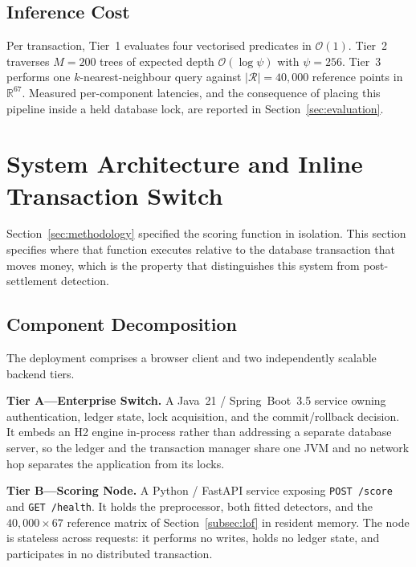 \documentclass[conference]{IEEEtran}
\begin{document}
\subsection{Inference Cost}
\label{subsec:cost}

Per transaction, Tier~1 evaluates four vectorised predicates in
$\mathcal{O}(1)$. Tier~2 traverses $M=200$ trees of expected depth
$\mathcal{O}(\log \psi)$ with $\psi = 256$. Tier~3 performs one
$k$-nearest-neighbour query against $|\mathcal{R}| = 40{,}000$
reference points in $\mathbb{R}^{67}$. Measured per-component
latencies, and the consequence of placing this pipeline inside a held
database lock, are reported in Section~\ref{sec:evaluation}.

\section{System Architecture and Inline Transaction Switch}
\label{sec:architecture}

Section~\ref{sec:methodology} specified the scoring function in
isolation. This section specifies where that function executes relative
to the database transaction that moves money, which is the property
that distinguishes this system from post-settlement detection.

\subsection{Component Decomposition}
\label{subsec:components}

The deployment comprises a browser client and two independently
scalable backend tiers.

\textbf{Tier A---Enterprise Switch.} A Java~21 / Spring~Boot~3.5
service owning authentication, ledger state, lock acquisition, and the
commit/rollback decision. It embeds an H2 engine in-process rather than
addressing a separate database server, so the ledger and the
transaction manager share one JVM and no network hop separates the
application from its locks.

\textbf{Tier B---Scoring Node.} A Python / FastAPI service exposing
\texttt{POST /score} and \texttt{GET /health}. It holds the
preprocessor, both fitted detectors, and the $40{,}000\times 67$
reference matrix of Section~\ref{subsec:lof} in resident memory. The
node is stateless across requests: it performs no writes, holds no
ledger state, and participates in no distributed transaction.
\end{document}
